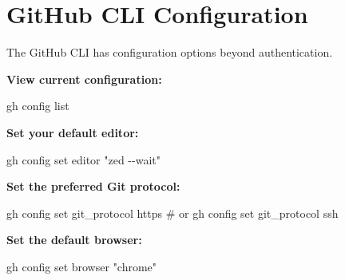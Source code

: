 \documentclass[
  letterpaper,
  DIV=11,
  numbers=noendperiod]{scrreprt}
\newenvironment{Shaded}{\begin{snugshade}}{\end{snugshade}}
\newcommand{\CommentTok}[1]{\textcolor[rgb]{0.37,0.37,0.37}{#1}}
\newcommand{\ExtensionTok}[1]{\textcolor[rgb]{0.00,0.23,0.31}{#1}}
\newcommand{\NormalTok}[1]{\textcolor[rgb]{0.00,0.23,0.31}{#1}}
\newcommand{\StringTok}[1]{\textcolor[rgb]{0.13,0.47,0.30}{#1}}
\begin{document}
\section{GitHub CLI Configuration}\label{github-cli-configuration}

The GitHub CLI has configuration options beyond authentication.

\textbf{View current configuration:}

\begin{codelisting}

\caption{\texttt{terminal}}

\begin{Shaded}
\begin{Highlighting}[]
\ExtensionTok{gh}\NormalTok{ config list}
\end{Highlighting}
\end{Shaded}

\end{codelisting}

\textbf{Set your default editor:}

\begin{codelisting}

\caption{\texttt{terminal}}

\begin{Shaded}
\begin{Highlighting}[]
\ExtensionTok{gh}\NormalTok{ config set editor }\StringTok{"zed {-}{-}wait"}
\end{Highlighting}
\end{Shaded}

\end{codelisting}

\textbf{Set the preferred Git protocol:}

\begin{codelisting}

\caption{\texttt{terminal}}

\begin{Shaded}
\begin{Highlighting}[]
\ExtensionTok{gh}\NormalTok{ config set git\_protocol https}
\CommentTok{\# or}
\ExtensionTok{gh}\NormalTok{ config set git\_protocol ssh}
\end{Highlighting}
\end{Shaded}

\end{codelisting}

\textbf{Set the default browser:}

\begin{codelisting}

\caption{\texttt{terminal}}

\begin{Shaded}
\begin{Highlighting}[]
\ExtensionTok{gh}\NormalTok{ config set browser }\StringTok{"chrome"}
\end{Highlighting}
\end{Shaded}

\end{codelisting}
\end{document}
